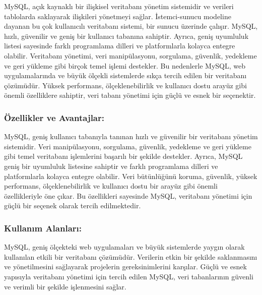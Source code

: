 MySQL, açık kaynaklı bir ilişkisel veritabanı yönetim sistemidir ve verileri tablolarda saklayarak ilişkileri yönetmeyi sağlar. İstemci-sunucu modeline dayanan bu çok kullanıcılı veritabanı sistemi, bir sunucu üzerinde çalışır. MySQL, hızlı, güvenilir ve geniş bir kullanıcı tabanına sahiptir. Ayrıca, geniş uyumluluk listesi sayesinde farklı programlama dilleri ve platformlarla kolayca entegre olabilir. Veritabanı yönetimi, veri manipülasyonu, sorgulama, güvenlik, yedekleme ve geri yükleme gibi birçok temel işlemi destekler. Bu nedenlerle MySQL, web uygulamalarında ve büyük ölçekli sistemlerde sıkça tercih edilen bir veritabanı çözümüdür. Yüksek performans, ölçeklenebilirlik ve kullanıcı dostu arayüz gibi önemli özelliklere sahiptir, veri tabanı yönetimi için güçlü ve esnek bir seçenektir.
\subsubsection{Özellikler ve Avantajlar:}
MySQL, geniş kullanıcı tabanıyla tanınan hızlı ve güvenilir bir veritabanı yönetim sistemidir. Veri manipülasyonu, sorgulama, güvenlik, yedekleme ve geri yükleme gibi temel veritabanı işlemlerini başarılı bir şekilde destekler. Ayrıca, MySQL geniş bir uyumluluk listesine sahiptir ve farklı programlama dilleri ve platformlarla kolayca entegre olabilir. Veri bütünlüğünü koruma, güvenlik, yüksek performans, ölçeklenebilirlik ve kullanıcı dostu bir arayüz gibi önemli özellikleriyle öne çıkar. Bu özellikleri sayesinde MySQL, veritabanı yönetimi için güçlü bir seçenek olarak tercih edilmektedir.

\subsubsection{Kullanım Alanları:}
MySQL, geniş ölçekteki web uygulamaları ve büyük sistemlerde yaygın olarak kullanılan etkili bir veritabanı çözümüdür. Verilerin etkin bir şekilde saklanmasını ve yönetilmesini sağlayarak projelerin gereksinimlerini karşılar. Güçlü ve esnek yapısıyla veritabanı yönetimi için tercih edilen MySQL, veri tabanlarının güvenli ve verimli bir şekilde işlenmesini sağlar.
